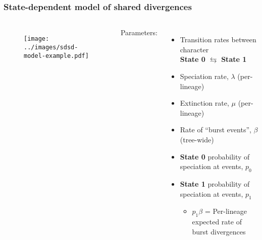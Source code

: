 {
\begin{frame}[t]
    \frametitle{State-dependent model of shared divergences}

    \vspace{-2mm}
    \begin{columns}[T]

        \begin{minipage}[t][\frametextheight][t]{\columnwidth}
            \begin{figure}
                \begin{center}
                    \texttt{[image: ../images/sdsd-model-example.pdf]}
                \end{center}
            \end{figure}
        \end{minipage}



        \begin{minipage}[t][\frametextheight][c]{\columnwidth}

            Parameters:

            \begin{itemize}
                \item Transition rates between character \\
                    \textbf{State 0} $\leftrightarrows$ \textbf{\textcolor{dbluestate}{State 1}}
                \item Speciation rate, $\lambda$ (per-lineage)
                \item Extinction rate, $\mu$ (per-lineage)
                \item Rate of ``burst events'', $\beta$ (tree-wide)
                \item \textbf{State 0} probability of speciation at events, $p_0$
                \item \textbf{\textcolor{dbluestate}{State 1}} probability of speciation at events, $p_1$
                \begin{itemize}
                    \item<2-> $p_1 \beta$ = Per-lineage expected rate of burst divergences
                \end{itemize}
            \end{itemize}


\end{minipage}
\end{columns}
\end{frame}}
